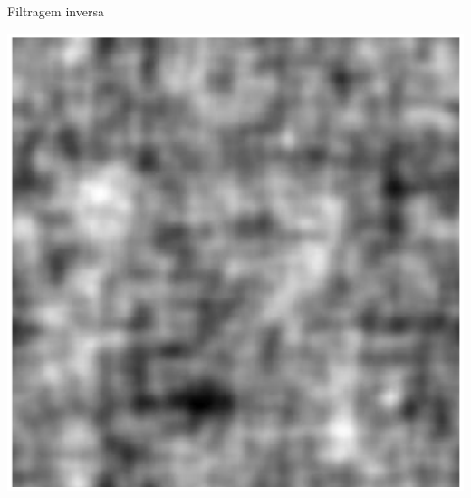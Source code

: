 \begin{slide}{Filtragem inversa}
\begin{itemize}
{\begin{center}
			\includegraphics[height = 0.35\textheight]{figs/5-27a}
		\end{center}}
\end{itemize}
\end{slide}

